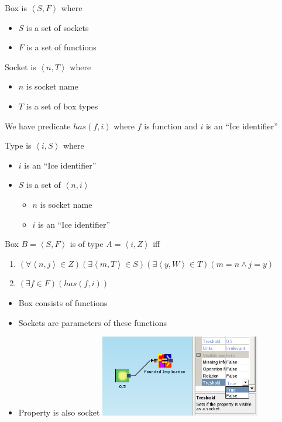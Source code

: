 \documentclass[a4paper,12pt]{book}
\begin{document}
Box is $\left<S,F\right>$ where
\begin{itemize}
	\item $S$ is a set of sockets
	\item $F$ is a set of functions
\end{itemize}
	
Socket is $\left<n,T\right>$ where
\begin{itemize}
	\item $n$ is socket name
	\item $T$ is a set of box types
\end{itemize}

We have predicate $has(f,i)$ where $f$ is function and $i$ is an ``Ice identifier''

Type is $\left<i,S\right>$ where
\begin{itemize}
	\item $i$ is an ``Ice identifier''
	\item $S$ is a set of $\left<n,i\right>$
	\begin{itemize}
		\item $n$ is socket name
		\item $i$ is an ``Ice identifier''
	\end{itemize}
\end{itemize}

Box $B=\left<S,F\right>$ is of type $A=\left<i,Z\right>$ iff 
\begin{enumerate}
	\item $(\forall \left<n,j\right>\in Z)(\exists \left<m,T\right>\in S)(\exists \left<y,W\right>\in T)(m=n \wedge j=y)$
	\item $(\exists f\in F)(has(f,i))$
\end{enumerate}
	
\begin{itemize}
	\item Box consists of functions
	\item Sockets are parameters of these functions
	\item Property is also socket
		\includegraphics[width=7cm]{property_as_socket}
\end{itemize}
\end{document}
